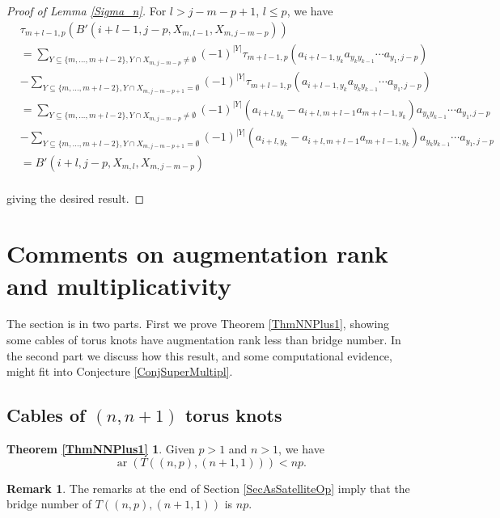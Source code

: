 \documentclass[11pt]{amsart}
\def\ar{\operatorname{ar}}
\theoremstyle{definition}
\newtheorem{rem}[thm]{Remark}
\begin{document}
\begin{proof} [Proof of Lemma \ref{Sigma_n}]
For $l > j-m-p + 1$, $l\le p$, we have
\begin{align*}
&\tau_{m + l - 1,p}( B'(i+l-1,j-p,X_{m,l-1},X_{m,j-m-p}))\\
&= \sum_{Y\subseteq \{m,\ldots,m+l-2\},Y\cap X_{m,j-m-p}\ne\emptyset}(-1)^{|Y|}\tau_{m + l - 1,p}(a_{i+l-1,y_k}a_{y_ky_{k-1}}\cdots a_{y_1,j-p})\\
& - \sum_{Y\subseteq \{m,\ldots,m+l-2\},Y\cap X_{m,j-m-p+1}=\emptyset}(-1)^{|Y|}\tau_{m + l - 1,p}(a_{i+l-1,y_k}a_{y_ky_{k-1}}\cdots a_{y_1,j-p})\\
&= \sum_{Y\subseteq \{m,\ldots,m+l-2\},Y\cap X_{m,j-m-p}\ne\emptyset}(-1)^{|Y|}(a_{i+l,y_k} - a_{i+l,m+l-1}a_{m+l-1,y_k})a_{y_ky_{k-1}}\cdots a_{y_1,j-p}\\
& - \sum_{Y\subseteq \{m,\ldots,m+l-2\},Y\cap X_{m,j-m-p+1}=\emptyset}(-1)^{|Y|}(a_{i+l,y_k} - a_{i+l,m+l-1}a_{m+l-1,y_k})a_{y_ky_{k-1}}\cdots a_{y_1,j-p}\\
&= B'(i+l,j-p,X_{m,l},X_{m,j-m-p})\\
\end{align*}

giving the desired result.
\end{proof}

\section{Comments on augmentation rank and multiplicativity}
\label{SecComments}

The section is in two parts. First we prove Theorem \ref{ThmNNPlus1}, showing some cables of torus knots have augmentation rank less than bridge number. In the second part we discuss how this result, and some computational evidence, might fit into Conjecture \ref{ConjSuperMultipl}.

\subsection{Cables of $(n,n+1)$ torus knots}
\label{SecNNPlus1}

\newtheorem*{ThmNNPlus1}{Theorem \ref{ThmNNPlus1}}
\begin{ThmNNPlus1}Given $p>1$ and $n>1$, we have \[\ar(T((n,p),(n+1,1))) < np.\]
\end{ThmNNPlus1}

\begin{rem} The remarks at the end of Section \ref{SecAsSatelliteOp} imply that the bridge number of $T((n,p),(n+1,1))$ is $np$.
\end{rem}
\end{document}
